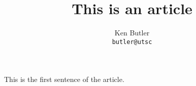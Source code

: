 \documentclass{article}
\author{Ken Butler\\
\texttt{butler@utsc}
}
\title{This is an article}
\begin{document}
\maketitle

This is the first sentence of the article.
\end{document}
